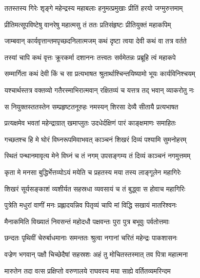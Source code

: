 
\twolineshloka
{ततस्तस्य गिरेः शृङ्गे महेन्द्रस्य महाबलाः}
{हनुमत्प्रमुखाः प्रीतिं हरयो जग्मुरुत्तमाम्} %

\twolineshloka
{प्रीतिमत्सूपविष्टेषु वानरेषु महात्मसु}
{तं ततः प्रतिसंहृष्टः प्रीतियुक्तं महाकपिम्} %

\twolineshloka
{जाम्बवान् कार्यवृत्तान्तमपृच्छदनिलात्मजम्}
{कथं दृष्टा त्वया देवी कथं वा तत्र वर्तते} %

\twolineshloka
{तस्यां चापि कथं वृत्तः क्रूरकर्मा दशाननः}
{तत्त्वतः सर्वमेतन्नः प्रब्रूहि त्वं महाकपे} %

\twolineshloka
{सम्मार्गिता कथं देवी किं च सा प्रत्यभाषत}
{श्रुतार्थाश्चिन्तयिष्यामो भूयः कार्यविनिश्चयम्} %

\twolineshloka
{यश्चार्थस्तत्र वक्तव्यो गतैरस्माभिरात्मवान्}
{रक्षितव्यं च यत्तत्र तद् भवान् व्याकरोतु नः} %

\twolineshloka
{स नियुक्तस्ततस्तेन सम्प्रहृष्टतनूरुहः}
{नमस्यन् शिरसा देव्यै सीतायै प्रत्यभाषत} %

\twolineshloka
{प्रत्यक्षमेव भवतां महेन्द्राग्रात् खमाप्लुतः}
{उदधेर्दक्षिणं पारं काङ्क्षमाणः समाहितः} %

\twolineshloka
{गच्छतश्च हि मे घोरं विघ्नरूपमिवाभवत्}
{काञ्चनं शिखरं दिव्यं पश्यामि सुमनोहरम्} %

\twolineshloka
{स्थितं पन्थानमावृत्य मेने विघ्नं च तं नगम्}
{उपसङ्गम्य तं दिव्यं काञ्चनं नगमुत्तमम्} %

\twolineshloka
{कृता मे मनसा बुद्धिर्भेत्तव्योऽयं मयेति च}
{प्रहतस्य मया तस्य लाङ्गूलेन महागिरेः} %

\twolineshloka
{शिखरं सूर्यसङ्काशं व्यशीर्यत सहस्रधा}
{व्यवसायं च तं बुद्ध्वा स होवाच महागिरिः} %

\twolineshloka
{पुत्रेति मधुरां वाणीं मनः प्रह्लादयन्निव}
{पितृव्यं चापि मां विद्धि सखायं मातरिश्वनः} %

\twolineshloka
{मैनाकमिति विख्यातं निवसन्तं महोदधौ}
{पक्षवन्तः पुरा पुत्र बभूवुः पर्वतोत्तमाः} %

\twolineshloka
{छन्दतः पृथिवीं चेरुर्बाधमानाः समन्ततः}
{श्रुत्वा नगानां चरितं महेन्द्रः पाकशासनः} %

\twolineshloka
{वज्रेण भगवान् पक्षौ चिच्छेदैषां सहस्रशः}
{अहं तु मोचितस्तस्मात् तव पित्रा महात्मना} %

\twolineshloka
{मारुतेन तदा वत्स प्रक्षिप्तो वरुणालये}
{राघवस्य मया साह्ये वर्तितव्यमरिन्दम} %


